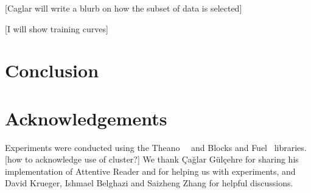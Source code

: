 \documentclass{article} %
\begin{document}
[Caglar will write a blurb on how the subset of data is selected]

[I will show training curves]

\section{Conclusion}

\section*{Acknowledgements}

Experiments were conducted using the Theano~\cite{theano1}~\cite{theano2} and Blocks and Fuel~\cite{blocks} libraries.
[how to acknowledge use of cluster?]
We thank Çağlar Gülçehre for sharing his implementation of Attentive Reader and for helping us with experiments,
and David Krueger, Ishmael Belghazi and Saizheng Zhang for helpful discussions.



\end{document}
